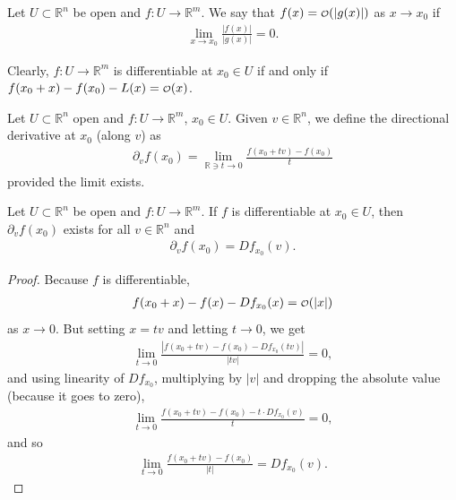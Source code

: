 \begin{definition}\label{def:smalO-notation}
	Let $U \subset \mathbb{R}^{n}$ be open and $f: U \to \mathbb{R}^{m}$. We say that $f(x) = \smalO(\left| g(x) \right|)$ as $x \to x_{0}$ if
	\begin{align*}
		\lim_{x \to x_{0}} \frac{\left| f(x) \right| }{\left| g(x) \right| } = 0.
	\end{align*}
\end{definition}

\begin{remark}
	Clearly, $f: U \to \mathbb{R}^{m}$ is differentiable at $x_{0} \in U$ if and only if $f(x_{0} + x) - f(x_{0}) - L(x) = \smalO(x)$.
\end{remark}

\begin{definition}\label{def:directional-derivative}
	Let $U \subset \mathbb{R}^{n}$ open and $f:U \to \mathbb{R}^{m}$, $x_{0} \in U$. Given $v \in \mathbb{R}^{n}$, we define the directional derivative at $x_{0}$ (along $v$) as
	\begin{align*}
		\partial_{v}f(x_{0}) = \lim_{\mathbb{R}\ni t \to 0} \frac{f(x_{0} + tv)-f(x_{0})}{t}
	\end{align*}
	provided the limit exists.
\end{definition}

\begin{prop}\label{prop:diff-impl-dir-diff}
	Let $U \subset \mathbb{R}^{n}$ be open and $f: U \to \mathbb{R}^{m}$. If $f$ is differentiable at $x_{0} \in U$, then $ \partial_{v}f(x_{0})$ exists for all $v \in \mathbb{R}^{n}$ and
	\begin{align*}
		\partial_{v}f(x_{0}) = Df_{x_{0}}(v).
	\end{align*}
\end{prop}
\begin{proof}
	Because $f$ is differentiable,
	\begin{align*}
		f(x_{0} + x) - f(x) - Df_{x_{0}}(x) = \smalO(\left| x \right|)
	\end{align*}
	as $x \to 0$. But setting $x = tv$ and letting $t \to  0$, we get
	\begin{align*}
		\lim_{t \to 0} \frac{\left| f(x_{0}+tv) - f(x_{0}) - Df_{x_{0}}(tv) \right|}{\left| tv \right| } = 0,
	\end{align*}
	and using linearity of $Df_{x_{0}}$, multiplying by $\left| v \right|$ and dropping the absolute value (because it goes to zero),
	\begin{align*}
		\lim_{t \to 0}  \frac{f(x_{0} + tv) - f(x_{0}) - t \cdot Df_{x_{0}}(v)}{ t } = 0,
	\end{align*}
	and so
	\begin{align*}
		\lim_{t \to 0}  \frac{f(x_{0} + tv) - f(x_{0})}{\left| t \right| } =  Df_{x_{0}}(v).
	\end{align*}
\end{proof}

